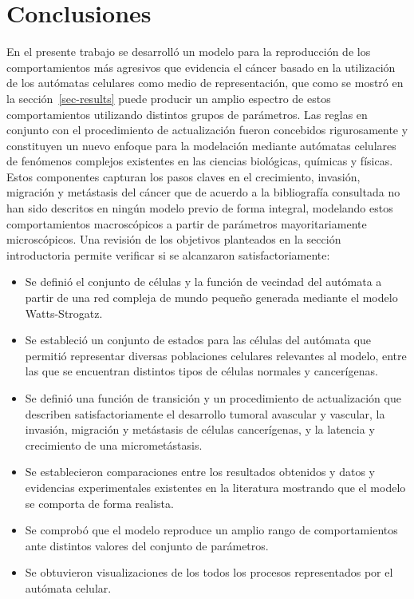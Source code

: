\chapter{Conclusiones}
En el presente trabajo se desarroll\'o un modelo para la reproducci\'on de los comportamientos m\'as agresivos que evidencia el c\'ancer basado en la utilizaci\'on de los aut\'omatas celulares como medio de representaci\'on, que como se mostr\'o en la secci\'on~\ref{sec-results} puede producir un amplio espectro de estos comportamientos utilizando distintos grupos de par\'ametros. Las reglas en conjunto con el procedimiento de actualizaci\'on fueron concebidos rigurosamente y constituyen un nuevo enfoque para la modelaci\'on mediante aut\'omatas celulares de fen\'omenos complejos existentes en las ciencias biol\'ogicas, qu\'imicas y f\'isicas. Estos componentes capturan los pasos claves en el crecimiento, invasi\'on, migraci\'on y met\'astasis del c\'ancer que de acuerdo a la bibliograf\'ia consultada no han sido descritos en ning\'un modelo previo de forma integral, modelando estos comportamientos macrosc\'opicos a partir de par\'ametros mayoritariamente microsc\'opicos. Una revisi\'on de los objetivos planteados en la secci\'on introductoria permite verificar si se alcanzaron satisfactoriamente:

\begin{itemize}
\item Se defini\'o el conjunto de c\'elulas y la funci\'on de vecindad del aut\'omata a partir de una red compleja de mundo peque\~no generada mediante el modelo Watts-Strogatz.

\item Se estableci\'o un conjunto de estados para las c\'elulas del aut\'omata que permiti\'o representar diversas poblaciones celulares relevantes al modelo, entre las que se encuentran distintos tipos de c\'elulas normales y cancer\'igenas.

\item Se defini\'o una funci\'on de transici\'on y un procedimiento de actualizaci\'on que describen satisfactoriamente el desarrollo tumoral avascular y vascular, la invasi\'on, migraci\'on y met\'astasis de c\'elulas cancer\'igenas, y la latencia y crecimiento de una micromet\'astasis. 

\item Se establecieron comparaciones entre los resultados obtenidos y datos y evidencias experimentales existentes en la literatura mostrando que el modelo se comporta de forma realista.

\item Se comprob\'o que el modelo reproduce un amplio rango de comportamientos ante distintos valores del conjunto de par\'ametros.

\item Se obtuvieron visualizaciones de los todos los procesos representados por el aut\'omata celular.
\end{itemize}

